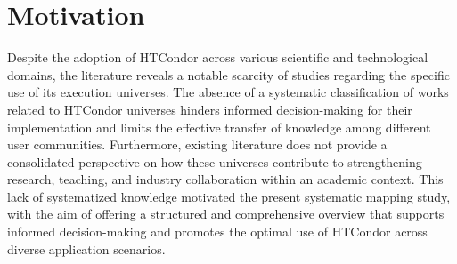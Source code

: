 \section{Motivation}\label{sec:motivacion}
Despite the adoption of HTCondor across various scientific and technological domains, the literature reveals a notable scarcity of studies regarding the specific use of its execution universes.
The absence of a systematic classification of works related to HTCondor universes hinders informed decision-making for their implementation and limits the effective transfer of knowledge among different user communities. Furthermore, existing literature does not provide a consolidated perspective on how these universes contribute to strengthening research, teaching, and industry collaboration within an academic context.
This lack of systematized knowledge motivated the present systematic mapping study, with the aim of offering a structured and comprehensive overview that supports informed decision-making and promotes the optimal use of HTCondor across diverse application scenarios.
